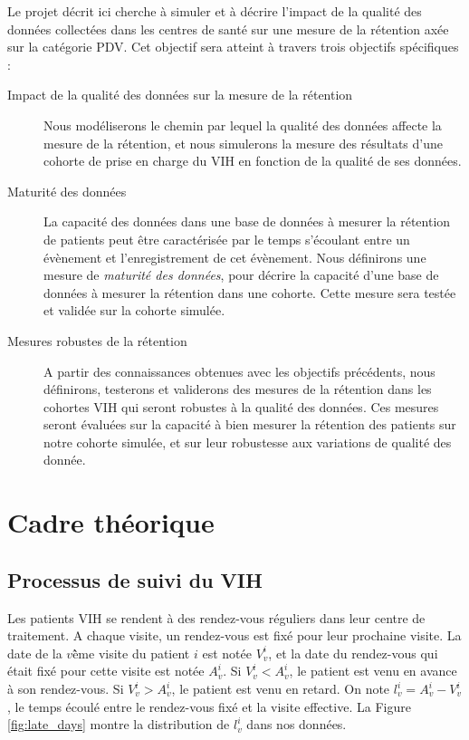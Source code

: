 \documentclass[paper=a4, fontsize=11pt]{scrartcl}
\numberwithin{equation}{section}		%
\numberwithin{figure}{section}			%
\numberwithin{table}{section}				%
\begin{document}
Le projet décrit ici cherche à simuler et à décrire l'impact de la qualité des données collectées dans les centres de santé sur une mesure de la rétention axée sur la catégorie PDV. Cet objectif sera atteint à travers trois objectifs spécifiques :
\begin{description}
	\item[Impact de la qualité des données sur la mesure de la rétention] Nous modéliserons le chemin par lequel la qualité des données affecte la mesure de la rétention, et nous simulerons la mesure des résultats d'une cohorte de prise en charge du VIH en fonction de la qualité de ses données.
	\item[Maturité des données] La capacité des données dans une base de données à mesurer la rétention de patients peut être caractérisée par le temps s'écoulant entre un évènement et l'enregistrement de cet évènement. Nous définirons une mesure de \textit{maturité des données}, pour décrire la capacité d'une base de données à mesurer la rétention dans une cohorte. Cette mesure sera testée et validée sur la cohorte simulée.
	\item[Mesures robustes de la rétention] A partir des connaissances obtenues avec les objectifs précédents, nous définirons, testerons et validerons des mesures de la rétention dans les cohortes VIH qui seront robustes à la qualité des données. Ces mesures seront évaluées sur la capacité à bien mesurer la rétention des patients sur notre cohorte simulée, et sur leur robustesse aux variations de qualité des donnée.
\end{description}

\section{Cadre théorique}
\label{sec:theory}

\subsection{Processus de suivi du VIH}

Les patients VIH se rendent à des rendez-vous réguliers dans leur centre de traitement. A chaque visite, un rendez-vous est fixé pour leur prochaine visite. La date de la $v$\^{ème} visite du patient $i$ est notée $V_v^i$, et la date du rendez-vous qui était fixé pour cette visite est notée $A_v^i$. Si $V_v^i < A_v^i$, le patient est venu en avance à son rendez-vous. Si $V_v^i > A_v^i$, le patient est venu en retard. On note $l_v^i = A_v^i - V_v^i$, le temps écoulé entre le rendez-vous fixé et la visite effective. La Figure \ref{fig:late_days} montre la distribution de $l_v^i$ dans nos données.
\end{document}

